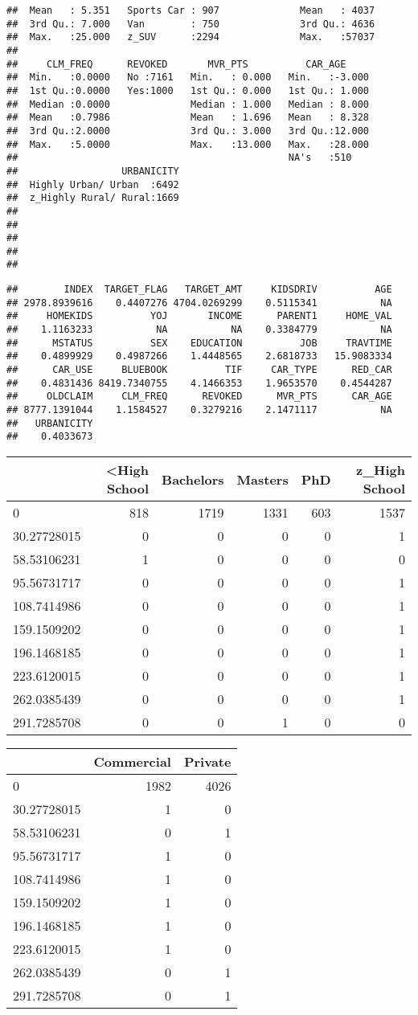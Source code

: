 \documentclass[]{article}
\begin{document}
\begin{verbatim}
##  Mean   : 5.351   Sports Car : 907              Mean   : 4037  
##  3rd Qu.: 7.000   Van        : 750              3rd Qu.: 4636  
##  Max.   :25.000   z_SUV      :2294              Max.   :57037  
##                                                                
##     CLM_FREQ      REVOKED       MVR_PTS          CAR_AGE      
##  Min.   :0.0000   No :7161   Min.   : 0.000   Min.   :-3.000  
##  1st Qu.:0.0000   Yes:1000   1st Qu.: 0.000   1st Qu.: 1.000  
##  Median :0.0000              Median : 1.000   Median : 8.000  
##  Mean   :0.7986              Mean   : 1.696   Mean   : 8.328  
##  3rd Qu.:2.0000              3rd Qu.: 3.000   3rd Qu.:12.000  
##  Max.   :5.0000              Max.   :13.000   Max.   :28.000  
##                                               NA's   :510     
##                  URBANICITY  
##  Highly Urban/ Urban  :6492  
##  z_Highly Rural/ Rural:1669  
##                              
##                              
##                              
##                              
## 
\end{verbatim}

\begin{verbatim}
##        INDEX  TARGET_FLAG   TARGET_AMT     KIDSDRIV          AGE 
## 2978.8939616    0.4407276 4704.0269299    0.5115341           NA 
##     HOMEKIDS          YOJ       INCOME      PARENT1     HOME_VAL 
##    1.1163233           NA           NA    0.3384779           NA 
##      MSTATUS          SEX    EDUCATION          JOB     TRAVTIME 
##    0.4899929    0.4987266    1.4448565    2.6818733   15.9083334 
##      CAR_USE     BLUEBOOK          TIF     CAR_TYPE      RED_CAR 
##    0.4831436 8419.7340755    4.1466353    1.9653570    0.4544287 
##     OLDCLAIM     CLM_FREQ      REVOKED      MVR_PTS      CAR_AGE 
## 8777.1391044    1.1584527    0.3279216    2.1471117           NA 
##   URBANICITY 
##    0.4033673
\end{verbatim}

\begin{longtable}[c]{@{}lrrrrr@{}}
\toprule
& \textless{}High School & Bachelors & Masters & PhD & z\_High
School\tabularnewline
\midrule
\endhead
0 & 818 & 1719 & 1331 & 603 & 1537\tabularnewline
30.27728015 & 0 & 0 & 0 & 0 & 1\tabularnewline
58.53106231 & 1 & 0 & 0 & 0 & 0\tabularnewline
95.56731717 & 0 & 0 & 0 & 0 & 1\tabularnewline
108.7414986 & 0 & 0 & 0 & 0 & 1\tabularnewline
159.1509202 & 0 & 0 & 0 & 0 & 1\tabularnewline
196.1468185 & 0 & 0 & 0 & 0 & 1\tabularnewline
223.6120015 & 0 & 0 & 0 & 0 & 1\tabularnewline
262.0385439 & 0 & 0 & 0 & 0 & 1\tabularnewline
291.7285708 & 0 & 0 & 1 & 0 & 0\tabularnewline
\bottomrule
\end{longtable}

\begin{longtable}[c]{@{}lrr@{}}
\toprule
& Commercial & Private\tabularnewline
\midrule
\endhead
0 & 1982 & 4026\tabularnewline
30.27728015 & 1 & 0\tabularnewline
58.53106231 & 0 & 1\tabularnewline
95.56731717 & 1 & 0\tabularnewline
108.7414986 & 1 & 0\tabularnewline
159.1509202 & 1 & 0\tabularnewline
196.1468185 & 1 & 0\tabularnewline
223.6120015 & 1 & 0\tabularnewline
262.0385439 & 0 & 1\tabularnewline
291.7285708 & 0 & 1\tabularnewline
\bottomrule
\end{longtable}
\end{document}
